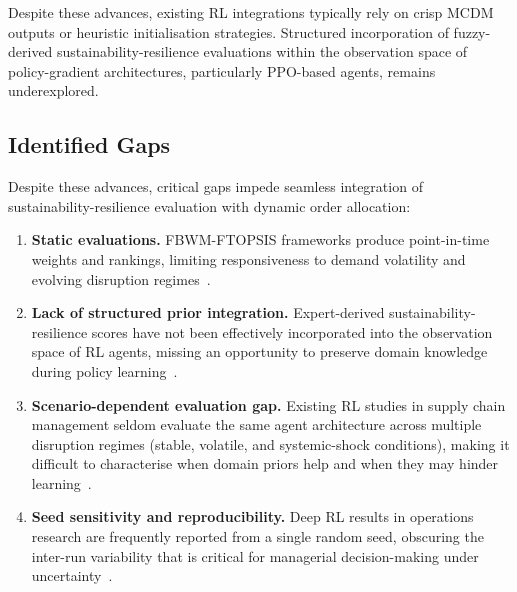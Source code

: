 \documentclass[preprint,12pt]{elsarticle}
\begin{document}
Despite these advances, existing RL integrations typically rely on crisp MCDM outputs or heuristic initialisation strategies. Structured incorporation of fuzzy-derived sustainability-resilience evaluations within the observation space of policy-gradient architectures, particularly PPO-based agents, remains underexplored.


\subsection{Identified Gaps}
Despite these advances, critical gaps impede seamless integration of sustainability-resilience evaluation with dynamic order allocation:
\begin{enumerate}
    \item \textbf{Static evaluations.} FBWM-FTOPSIS frameworks produce point-in-time weights and rankings, limiting responsiveness to demand volatility and evolving disruption regimes~\citep{Dubey_etal_2021}.
    \item \textbf{Lack of structured prior integration.} Expert-derived sustainability-resilience scores have not been effectively incorporated into the observation space of RL agents, missing an opportunity to preserve domain knowledge during policy learning~\citep{Chen_Kumar_2024}.
    \item \textbf{Scenario-dependent evaluation gap.} Existing RL studies in supply chain management seldom evaluate the same agent architecture across multiple disruption regimes (stable, volatile, and systemic-shock conditions), making it difficult to characterise when domain priors help and when they may hinder learning~\citep{Schulman_etal_2017}.
    \item \textbf{Seed sensitivity and reproducibility.} Deep RL results in operations research are frequently reported from a single random seed, obscuring the inter-run variability that is critical for managerial decision-making under uncertainty~\citep{Li_etal_2024}.
\end{enumerate}
\end{document}
